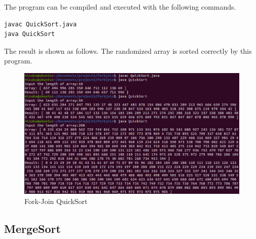 \documentclass[UTF8,10pt,a4paper]{article}
\theoremstyle{Problem}
\theoremstyle{Solution}
\begin{document}
The program can be compiled and executed with the following commands.

\begin{lstlisting}
javac QuickSort.java
java QuickSort
\end{lstlisting}


The result is shown as follows. The randomized array is sorted correctly by this program.
\begin{figure}[H]
    \centering
    \includegraphics[width=400pt]{quick.png}
    \caption{Fork-Join QuickSort}
    \label{3}
\end{figure}

\subsection{MergeSort}
\end{document}
